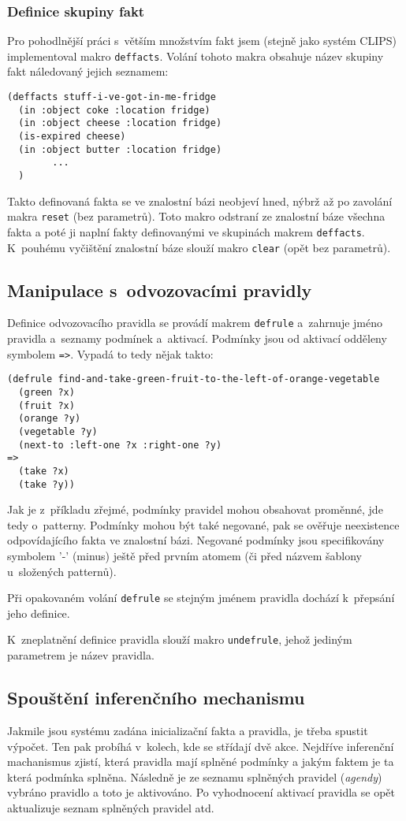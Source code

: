 \subsubsection{Definice skupiny fakt}
Pro pohodlnější práci s~větším množstvím fakt jsem (stejně jako systém
\textsf{CLIPS}) implementoval makro \verb|deffacts|. Volání tohoto makra obsahuje
název skupiny fakt náledovaný jejich seznamem:
\begin{verbatim}
(deffacts stuff-i-ve-got-in-me-fridge
  (in :object coke :location fridge)
  (in :object cheese :location fridge)
  (is-expired cheese)
  (in :object butter :location fridge)
        ...
  )
\end{verbatim}
Takto definovaná fakta se ve znalostní bázi neobjeví hned, nýbrž až po zavolání
makra \verb|reset| (bez parametrů). Toto makro odstraní ze znalostní báze
všechna fakta a poté ji naplní fakty definovanými ve skupinách makrem
\verb|deffacts|. K~pouhému vyčištění znalostní báze slouží makro \verb|clear|
(opět bez parametrů).
\subsection{Manipulace s~odvozovacími pravidly}
Definice odvozovacího pravidla se provádí makrem \verb|defrule| a~zahrnuje jméno
pravidla a~seznamy podmínek a~aktivací. Podmínky jsou od aktivací odděleny
symbolem \verb|=>|. Vypadá to tedy nějak takto:
\begin{verbatim}
(defrule find-and-take-green-fruit-to-the-left-of-orange-vegetable
  (green ?x)
  (fruit ?x)
  (orange ?y)
  (vegetable ?y)
  (next-to :left-one ?x :right-one ?y)
=>
  (take ?x)
  (take ?y))
\end{verbatim}
Jak je z~příkladu zřejmé, podmínky pravidel mohou obsahovat proměnné, jde tedy
o~patterny. Podmínky mohou být také negované, pak se ověřuje neexistence
odpovídajícího fakta ve znalostní bázi. Negované podmínky jsou specifikovány
symbolem '-' (minus) ještě před prvním atomem (či před názvem šablony u~složených
patternů).

Při opakovaném volání \verb|defrule| se stejným jménem pravidla dochází 
k~přepsání jeho definice.

K~zneplatnění definice pravidla slouží makro \verb|undefrule|, jehož jediným
parametrem je název pravidla.
\subsection{Spouštění inferenčního mechanismu}
Jakmile jsou systému zadána inicializační fakta a pravidla, je třeba spustit
výpočet. Ten pak probíhá v~kolech, kde se střídají dvě akce. Nejdříve inferenční
machanismus zjistí, která pravidla mají splněné podmínky a jakým faktem je ta
která podmínka splněna. Následně je ze seznamu splněných pravidel (\emph{agendy})
vybráno pravidlo a toto je aktivováno. Po vyhodnocení aktivací pravidla se opět
aktualizuje seznam splněných pravidel atd.

